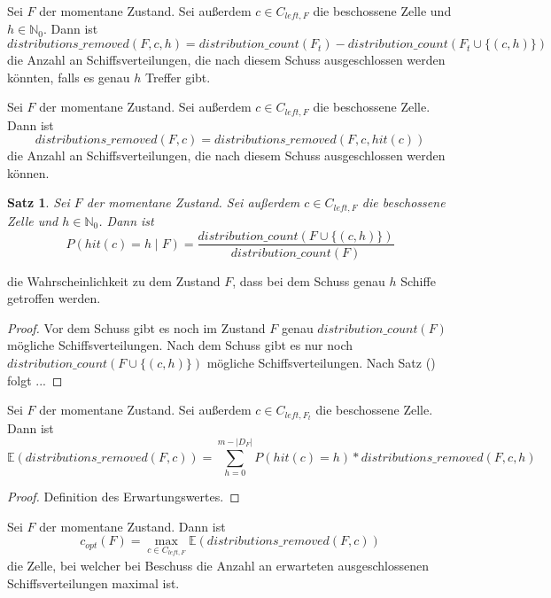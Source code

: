 \documentclass[a4paper,12pt]{llncs}
\newcommand{\N}{{\mathbb{N}}}
\numberwithin{equation}{section}
\newtheorem{satz}{Satz}
\begin{document}
\begin{definition}
Sei $F$ der momentane Zustand.
Sei außerdem $c \in C_{left,F}$ die beschossene Zelle und $h \in \N_0$.
Dann ist
\[
distributions\_removed(F,c,h)=distribution\_count(F_t) - distribution\_count(F_t \cup \{(c, h)\})
\]
die Anzahl an Schiffsverteilungen, die nach diesem Schuss ausgeschlossen werden könnten, falls es genau $h$ Treffer gibt.
\end{definition}

\begin{definition}
Sei $F$ der momentane Zustand.
Sei außerdem $c \in C_{left,F}$ die beschossene Zelle.
Dann ist
\[
distributions\_removed(F,c)=distributions\_removed(F, c, hit(c))
\]
die Anzahl an Schiffsverteilungen, die nach diesem Schuss ausgeschlossen werden können.
\end{definition}

\begin{satz}
Sei $F$ der momentane Zustand.
Sei außerdem $c \in C_{left,F}$ die beschossene Zelle und $h \in \N_0$.
Dann ist
\[
P(hit(c)=h \mid F)=\frac{distribution\_count(F \cup \{(c, h)\})}{distribution\_count(F)}
\]
\end{satz}
die Wahrscheinlichkeit zu dem Zustand $F$, dass bei dem Schuss genau $h$ Schiffe getroffen werden.

\begin{proof}
Vor dem Schuss gibt es noch im Zustand $F$ genau $distribution\_count(F)$ mögliche Schiffsverteilungen.
Nach dem Schuss gibt es nur noch $distribution\_count(F \cup \{(c, h)\})$ mögliche Schiffsverteilungen.
Nach Satz () folgt ...
\end{proof}

\begin{theorem}
Sei $F$ der momentane Zustand.
Sei außerdem $c \in C_{left,{F_t}}$ die beschossene Zelle.
Dann ist
\[
\mathds{E}(distributions\_removed(F,c))=\sum_{h=0}^{m - |D_F|} P(hit(c)=h) * distributions\_removed(F,c,h)
\]
\end{theorem}


\begin{proof}
Definition des Erwartungswertes.
\end{proof}

\begin{definition}
Sei $F$ der momentane Zustand.
Dann ist
\[
c_{opt}(F)=\max_{c \in C_{left,F}} \mathds{E}(distributions\_removed(F,c))
\]
die Zelle, bei welcher bei Beschuss die Anzahl an erwarteten ausgeschlossenen Schiffsverteilungen maximal ist.
\end{definition}


\newpage

 

\end{document}
